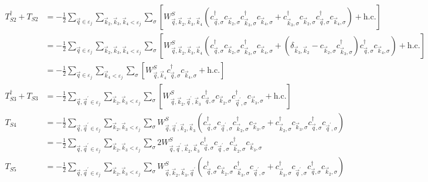 \documentclass{revtex4-2}
\begin{document}
\begin{equation}\begin{aligned}
	T_{S2}^\dagger + T_{S2} &= - \frac{1}{2}\sum_{\vec q \in \varepsilon_j}\sum_{\vec k_2, \vec k_3, \vec k_4 < \varepsilon_j}\sum_{\sigma} \left[W^S_{\vec q,\vec k_2,\vec k_3,\vec k_4}\left(c^\dagger_{\vec q,\sigma}c_{\vec k_2,\sigma}c^\dagger_{\vec k_3,\sigma}c_{\vec k_4,\sigma} + c^\dagger_{\vec k_3,\sigma}c_{\vec k_2,\sigma}c^\dagger_{\vec q,\sigma}c_{\vec k_4,\sigma}\right) + \text{h.c.}\right]\\
				&= - \frac{1}{2}\sum_{\vec q \in \varepsilon_j}\sum_{\vec k_2, \vec k_3, \vec k_4 < \varepsilon_j}\sum_{\sigma} \left[W^S_{\vec q,\vec k_2,\vec k_3,\vec k_4}\left(c^\dagger_{\vec q,\sigma}c_{\vec k_2,\sigma}c^\dagger_{\vec k_3,\sigma}c_{\vec k_4,\sigma} + \left(\delta_{\vec k_3,\vec k_2} - c_{\vec k_2,\sigma}c^\dagger_{\vec k_3,\sigma}\right)c^\dagger_{\vec q,\sigma}c_{\vec k_4,\sigma}\right) + \text{h.c.}\right]\\
				&= - \frac{1}{2}\sum_{\vec q \in \varepsilon_j}\sum_{\vec k_4 < \varepsilon_j}\sum_{\sigma} \left[W^S_{\vec q,\vec k_4}c^\dagger_{\vec q,\sigma}c_{\vec k_4,\sigma} + \text{h.c.}\right]\\
	T_{S3}^\dagger + T_{S3} &= - \frac{1}{2}\sum_{\vec q, \vec q^\prime \in \varepsilon_j}\sum_{\vec k_2, \vec k_3 < \varepsilon_j}\sum_{\sigma} \left[W^S_{\vec q,\vec k_2, \vec q^\prime, \vec k_3}c^\dagger_{\vec q,\sigma}c_{\vec k_2,\sigma}c^\dagger_{\vec q^\prime,\sigma}c_{\vec k_3,\sigma} + \text{h.c.}\right]\\
	T_{S4} &= - \frac{1}{2}\sum_{\vec q, \vec q^\prime \in \varepsilon_j}\sum_{\vec k_2, \vec k_3 < \varepsilon_j}\sum_{\sigma}W^S_{\vec q,\vec q^\prime,\vec k_2,\vec k_3} \left(c^\dagger_{\vec q,\sigma}c_{\vec q^\prime,\sigma}c^\dagger_{\vec k_2,\sigma}c_{\vec k_3,\sigma} + c^\dagger_{\vec k_2,\sigma}c_{\vec k_3,\sigma}c^\dagger_{\vec q,\sigma}c_{\vec q^\prime,\sigma}\right) \\
				&= - \frac{1}{2}\sum_{\vec q, \vec q^\prime \in \varepsilon_j}\sum_{\vec k_2, \vec k_3 < \varepsilon_j}\sum_{\sigma}2W^S_{\vec q,\vec q^\prime,\vec k_2,\vec k_3} c^\dagger_{\vec q,\sigma}c_{\vec q^\prime,\sigma}c^\dagger_{\vec k_2,\sigma}c_{\vec k_3,\sigma}\\
	T_{S5} &= - \frac{1}{2}\sum_{\vec q, \vec q^\prime \in \varepsilon_j}\sum_{\vec k_2, \vec k_3 < \varepsilon_j}\sum_{\sigma}W^S_{\vec q,\vec k_2,\vec k_3,\vec q^\prime} \left(c^\dagger_{\vec q,\sigma}c_{\vec k_2,\sigma}c^\dagger_{\vec k_3,\sigma}c_{\vec q^\prime,\sigma} + c^\dagger_{\vec k_3,\sigma}c_{\vec q^\prime,\sigma}c^\dagger_{\vec q,\sigma}c_{\vec k_2,\sigma}\right)\\

\end{aligned}
\end{equation}
\end{document}
